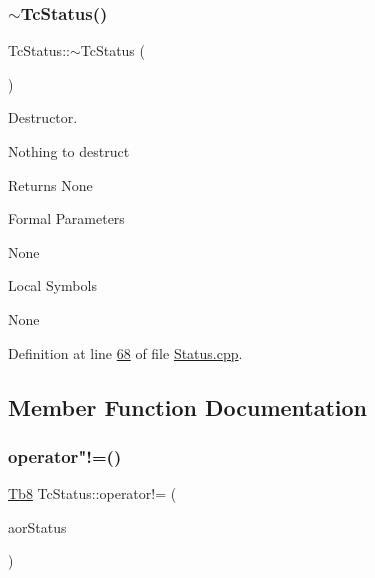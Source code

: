 \subsubsection{\texorpdfstring{$\sim$\+Tc\+Status()}{~TcStatus()}}
{\footnotesize\ttfamily Tc\+Status\+::$\sim$\+Tc\+Status (\begin{DoxyParamCaption}\item[{void}]{ }\end{DoxyParamCaption})}



Destructor. 

Nothing to destruct

\begin{DoxyReturn}{Returns}
None
\end{DoxyReturn}
\begin{DoxyParagraph}{Formal Parameters}

\begin{DoxyPre}{\ttfamily  None }\end{DoxyPre}

\end{DoxyParagraph}
\begin{DoxyParagraph}{Local Symbols}

\begin{DoxyPre}{\ttfamily  None }\end{DoxyPre}
 
\end{DoxyParagraph}


Definition at line \mbox{\hyperlink{_status_8cpp_source_l00068}{68}} of file \mbox{\hyperlink{_status_8cpp_source}{Status.\+cpp}}.



\subsection{Member Function Documentation}
\mbox{\label{class_g_n_common_1_1_n_notification_1_1_tc_status_acdf1eba6040e3cd5e244e21524ff0d86}} 
\subsubsection{\texorpdfstring{operator"!=()}{operator!=()}}
{\footnotesize\ttfamily \mbox{\hyperlink{namespace_g_n_common_a8115dc7ed53b6e5b52e6bfde1632ea74}{Tb8}} Tc\+Status\+::operator!= (\begin{DoxyParamCaption}\item[{const \mbox{\hyperlink{class_g_n_common_1_1_n_notification_1_1_tc_status}{Tc\+Status}} \&}]{aor\+Status }\end{DoxyParamCaption})}



